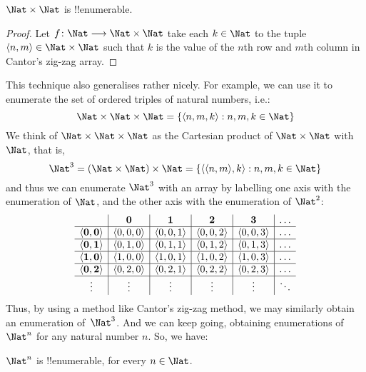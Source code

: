\documentclass[../../../include/open-logic-section]{subfiles}
\begin{document}
\begin{prop}
$\Nat \times \Nat$ is !!{enumerable}.
\end{prop}

\begin{proof}
Let $f \colon \Nat \to \Nat\times\Nat$ take each $k \in \Nat$ to the
tuple $\tuple{n,m} \in \Nat \times \Nat$ such that $k$ is the value of
the $n$th row and $m$th column in Cantor's zig-zag array. 
\end{proof}

\begin{explain}
This technique also generalises rather nicely. For example, we can use
it to enumerate the set of ordered triples of natural numbers, i.e.:
\[
\Nat \times \Nat \times \Nat = \Setabs{\tuple{n,m,k}}{n,m,k \in \Nat}
\]
We think of $\Nat \times \Nat \times \Nat$ as the Cartesian
product of $\Nat \times \Nat$ with $\Nat$, that is,
\[
\Nat^3 = (\Nat \times \Nat) \times \Nat =
\Setabs{\tuple{\tuple{n,m},k}}{n, m, k
  \in \Nat }
\]
and thus we can enumerate $\Nat^3$ with an array by labelling one
axis with the enumeration of $\Nat$, and the other axis with the
enumeration of $\Nat^2$:
\[
\begin{array}{ c | c | c | c | c | c}
& \textbf 0 & \textbf 1 & \textbf 2 & \textbf 3 & \dots \\
\hline
\mathbf{\tuple{0,0}} & \tuple{0,0,0} & \tuple{0,0,1} & \tuple{0,0,2} & \tuple{0,0,3} & \dots \\
\hline
\mathbf{\tuple{0,1}} & \tuple{0,1,0} & \tuple{0,1,1} & \tuple{0,1,2} & \tuple{0,1,3} & \dots \\
\hline
\mathbf{\tuple{1,0}} & \tuple{1,0,0} & \tuple{1,0,1} & \tuple{1,0,2} & \tuple{1,0,3} & \dots \\
\hline
\mathbf{\tuple{0,2}} & \tuple{0,2,0} & \tuple{0,2,1} & \tuple{0,2,2} & \tuple{0,2,3} & \dots\\
\hline
\vdots & \vdots & \vdots & \vdots & \vdots & \ddots \\
\end{array}
\]
Thus, by using a method like Cantor's zig-zag method, we may similarly
obtain an enumeration of~$\Nat^3$. And we can keep going, obtaining
enumerations of $\Nat^n$ for any natural number $n$. So, we have:
\end{explain}

\begin{prop}
$\Nat^n$ is !!{enumerable}, for every $n \in \Nat$.
\end{prop}
\end{document}
